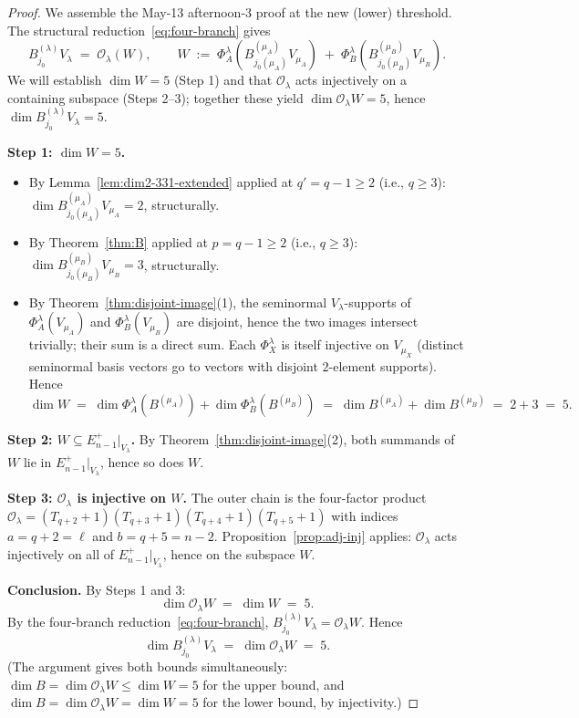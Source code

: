 \documentclass[11pt]{article}
\theoremstyle{definition}
\begin{document}
\begin{proof}
We assemble the May-13 afternoon-3 proof at the new (lower) threshold.
The structural reduction~\eqref{eq:four-branch} gives
\[
   B^{(\lambda)}_{j_0} V_\lambda
   \;=\;
   \mathcal{O}_\lambda(W),
   \qquad
   W \;:=\;
   \Phi_A^\lambda(B^{(\mu_A)}_{j_0(\mu_A)} V_{\mu_A})
   \;+\;
   \Phi_B^\lambda(B^{(\mu_B)}_{j_0(\mu_B)} V_{\mu_B}).
\]
We will establish $\dim W = 5$ (Step 1) and that $\mathcal{O}_\lambda$
acts injectively on a containing subspace (Steps 2--3); together these
yield $\dim \mathcal{O}_\lambda W = 5$, hence
$\dim B^{(\lambda)}_{j_0} V_\lambda = 5$.

\textbf{Step 1: $\dim W = 5$.}
\begin{itemize}[leftmargin=2em,topsep=0.2em,itemsep=0.1em]
\item By Lemma~\ref{lem:dim2-331-extended} applied at $q' = q - 1 \ge 2$
(i.e., $q \ge 3$):
$\dim B^{(\mu_A)}_{j_0(\mu_A)} V_{\mu_A} = 2$, structurally.
\item By Theorem~\ref{thm:B} applied at $p = q - 1 \ge 2$ (i.e., $q \ge 3$):
$\dim B^{(\mu_B)}_{j_0(\mu_B)} V_{\mu_B} = 3$, structurally.
\item By Theorem~\ref{thm:disjoint-image}(1), the seminormal
$V_\lambda$-supports of $\Phi_A^\lambda(V_{\mu_A})$ and
$\Phi_B^\lambda(V_{\mu_B})$ are disjoint, hence the two images
intersect trivially; their sum is a direct sum. Each $\Phi_X^\lambda$
is itself injective on $V_{\mu_X}$ (distinct seminormal basis vectors
go to vectors with disjoint $2$-element supports).
Hence
\[
   \dim W
   \;=\;
   \dim \Phi_A^\lambda(B^{(\mu_A)}) + \dim \Phi_B^\lambda(B^{(\mu_B)})
   \;=\;
   \dim B^{(\mu_A)} + \dim B^{(\mu_B)}
   \;=\;
   2 + 3 \;=\; 5.
\]
\end{itemize}

\textbf{Step 2: $W \subseteq E_{n-1}^+|_{V_\lambda}$.}
By Theorem~\ref{thm:disjoint-image}(2), both summands of $W$ lie in
$E_{n-1}^+|_{V_\lambda}$, hence so does $W$.

\textbf{Step 3: $\mathcal{O}_\lambda$ is injective on $W$.}
The outer chain is the four-factor product
$\mathcal{O}_\lambda = (T_{q+2}{+}1)(T_{q+3}{+}1)(T_{q+4}{+}1)(T_{q+5}{+}1)$
with indices $a = q + 2 = \ell$ and $b = q + 5 = n - 2$.
Proposition~\ref{prop:adj-inj} applies: $\mathcal{O}_\lambda$ acts
injectively on all of $E_{n-1}^+|_{V_\lambda}$, hence on the
subspace $W$.

\textbf{Conclusion.} By Steps 1 and 3:
\[
   \dim \mathcal{O}_\lambda W \;=\; \dim W \;=\; 5.
\]
By the four-branch reduction~\eqref{eq:four-branch},
$B^{(\lambda)}_{j_0} V_\lambda = \mathcal{O}_\lambda W$. Hence
\[
   \dim B^{(\lambda)}_{j_0} V_\lambda \;=\; \dim \mathcal{O}_\lambda W
   \;=\; 5.
\]
(The argument gives both bounds simultaneously: $\dim B = \dim \mathcal{O}_\lambda W
\le \dim W = 5$ for the upper bound, and $\dim B = \dim \mathcal{O}_\lambda W
= \dim W = 5$ for the lower bound, by injectivity.)
\end{proof}
\end{document}
